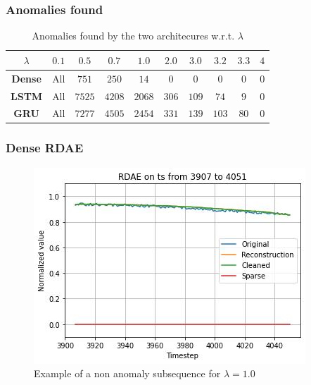 \documentclass{beamer}
\theoremstyle{plain}
\theoremstyle{definition}
\theoremstyle{remark}
\begin{document}
\begin{frame}
	\frametitle{Anomalies found}
	\begin{table}[width=\linewidth]
		\begin{tabular}{|c|c|c|c|c|c|c|c|c|c|}
		\hline
		\textbf{$\lambda$} & \textbf{$0.1$} & \textbf{$0.5$} & \textbf{$0.7$} & \textbf{$1.0$}  & \textbf{$2.0$} & \textbf{$3.0$} & \textbf{$3.2$} & \textbf{$3.3$} & \textbf{$4$}\\ \hline
		\textbf{Dense} & All       & $751$          & $250$          & $14$     & $0$            & $0$            & $0$            & $0$            & $0$ \\ \hline
		\textbf{LSTM}  & All        & $7525$         & $4208$         & $2068$  & $306$          & $109$          & $74$           & $9$            & $0$ \\ \hline
		\textbf{GRU}  & All        & $7277$         & $4505$         & $2454$  & $331$          & $139$          & $103$           & $80$            & $0$ \\ \hline
		\end{tabular}
		\caption[]{Anomalies found by the two architecures w.r.t. $\lambda$}
	\end{table}
\end{frame}

\begin{frame}
	\frametitle{Dense RDAE}
	\begin{figure}
		\centering
		\includegraphics[width=0.7\linewidth]{Images/lam1.0ts_non_anomaly3907.jpg}
		\caption[]{Example of a non anomaly subsequence for $\lambda=1.0$}
	\end{figure}
\end{frame}
\end{document}
